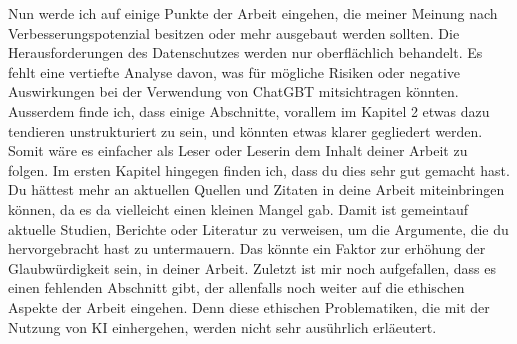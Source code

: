 \documentclass{article}
\begin{document}
Nun werde ich auf einige Punkte der Arbeit eingehen, die meiner Meinung nach Verbesserungspotenzial besitzen oder mehr ausgebaut werden sollten. Die Herausforderungen des Datenschutzes werden nur oberflächlich behandelt. Es fehlt eine vertiefte Analyse davon, was für mögliche Risiken oder negative Auswirkungen bei der Verwendung von ChatGBT mitsichtragen könnten. Ausserdem finde ich, dass einige Abschnitte, vorallem im Kapitel 2 etwas dazu tendieren unstrukturiert zu sein, und könnten etwas klarer gegliedert werden. Somit wäre es einfacher als Leser oder Leserin dem Inhalt deiner Arbeit zu folgen. Im ersten Kapitel hingegen finden ich, dass du dies sehr gut gemacht hast. Du hättest mehr an aktuellen Quellen und Zitaten in deine Arbeit miteinbringen können, da es da vielleicht einen kleinen Mangel gab. Damit ist gemeintauf aktuelle Studien, Berichte oder Literatur zu verweisen, um die Argumente, die du hervorgebracht hast zu untermauern. Das könnte ein Faktor  zur erhöhung der Glaubwürdigkeit sein, in deiner Arbeit. Zuletzt ist mir noch aufgefallen, dass es einen fehlenden Abschnitt gibt, der allenfalls noch weiter auf die ethischen Aspekte der Arbeit eingehen. Denn diese ethischen Problematiken, die mit der Nutzung von KI einhergehen, werden nicht sehr ausührlich erläeutert. 



\printbibliography
\end{document}
